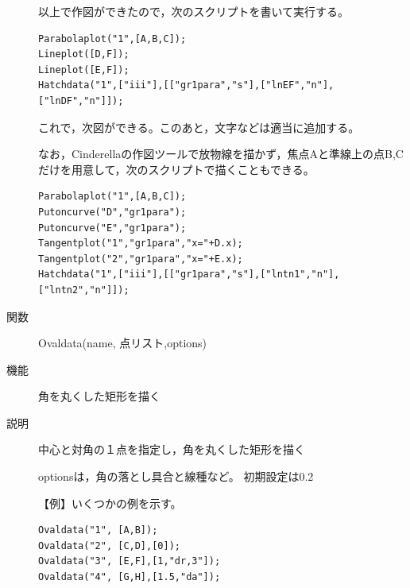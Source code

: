 \documentclass[papersize,a4paper,10pt,uplatex]{jsarticle}
\begin{document}
\begin{description}
\vspace{\baselineskip}
以上で作図ができたので，次のスクリプトを書いて実行する。
\begin{verbatim}
Parabolaplot("1",[A,B,C]);
Lineplot([D,F]);
Lineplot([E,F]);
Hatchdata("1",["iii"],[["gr1para","s"],["lnEF","n"],["lnDF","n"]]);
\end{verbatim}

これで，次図ができる。このあと，文字などは適当に追加する。
 
\vspace{\baselineskip}
\begin{center} \end{center}

なお，Cinderellaの作図ツールで放物線を描かず，焦点Aと準線上の点B,Cだけを用意して，次のスクリプトで描くこともできる。
\begin{verbatim}
Parabolaplot("1",[A,B,C]);
Putoncurve("D","gr1para");
Putoncurve("E","gr1para");
Tangentplot("1","gr1para","x="+D.x);
Tangentplot("2","gr1para","x="+E.x);
Hatchdata("1",["iii"],[["gr1para","s"],["lntn1","n"],["lntn2","n"]]);
\end{verbatim}


\hypertarget{ovaldata}{}
\item[関数]Ovaldata(name, 点リスト,options)
\item[機能]角を丸くした矩形を描く
\item[説明]中心と対角の１点を指定し，角を丸くした矩形を描く

optionsは，角の落とし具合と線種など。 初期設定は0.2 

\vspace{\baselineskip}
【例】いくつかの例を示す。
\begin{verbatim}
Ovaldata("1", [A,B]);
Ovaldata("2", [C,D],[0]);
Ovaldata("3", [E,F],[1,"dr,3"]);
Ovaldata("4", [G,H],[1.5,"da"]);
\end{verbatim}
\begin{center} \scalebox{0.9}{}\end{center}

\end{description}
\end{document}
